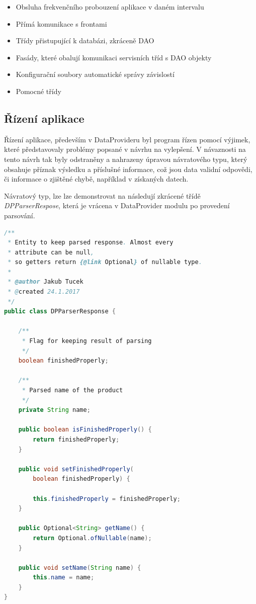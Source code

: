 \documentclass[thesis=B,czech]{FITthesis}[2012/06/26]
\begin{document}
\begin{itemize}
\item Obsluha frekvenčního probouzení aplikace v daném intervalu
\item Přímá komunikace s frontami
\item Třídy přistupující k databázi, zkráceně DAO
\item Fasády, které obalují komunikaci servisních tříd s DAO objekty
\item Konfigurační soubory automatické správy závislostí
\item Pomocné třídy
\end{itemize}

\subsection{Řízení aplikace}
Řízení aplikace, především v DataProvideru byl program řízen pomocí výjimek, které představovaly problémy popsané v návrhu na vylepšení.
V návaznosti na tento návrh tak byly odstraněny a nahrazeny úpravou návratového typu, který obsahuje příznak výsledku 
a příslušné informace, což jsou data validní odpovědi, či informace o zjištěné chybě, například v získaných datech.
\par
Návratový typ, lze lze demonstrovat na následují zkrácené třídě \textit{DPParserRespose}, která je vrácena v DataProvider modulu
po provedení parsování.

\begin{lstlisting}[language=Java]
/**
 * Entity to keep parsed response. Almost every 
 * attribute can be null, 
 * so getters return {@link Optional} of nullable type.
 *
 * @author Jakub Tucek
 * @created 24.1.2017
 */
public class DPParserResponse {

    /**
     * Flag for keeping result of parsing
     */
    boolean finishedProperly;

    /**
     * Parsed name of the product
     */
    private String name;

    public boolean isFinishedProperly() {
        return finishedProperly;
    }

    public void setFinishedProperly(
    	boolean finishedProperly) {
    	
        this.finishedProperly = finishedProperly;
    }

    public Optional<String> getName() {
        return Optional.ofNullable(name);
    }

    public void setName(String name) {
        this.name = name;
    }
}
\end{lstlisting}
\end{document}
